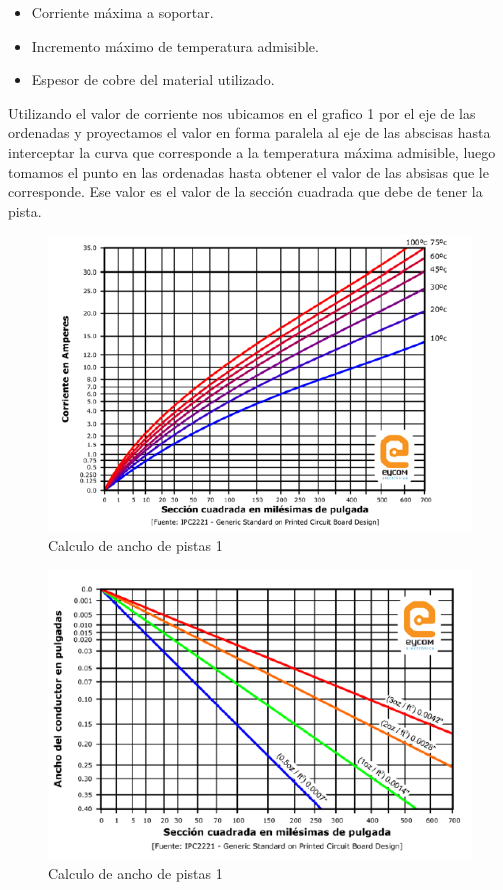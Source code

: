 \begin{itemize} 
\item Corriente máxima a soportar.
\item Incremento máximo de temperatura admisible.
\item Espesor de cobre del material utilizado.
\end{itemize}
Utilizando el valor de corriente nos ubicamos en el grafico 1 por el eje de las ordenadas y proyectamos el valor en forma paralela al eje de las abscisas hasta interceptar la curva que corresponde a la temperatura máxima admisible, luego tomamos el punto en las ordenadas hasta obtener el valor de las absisas que le corresponde. Ese valor es el valor de la sección cuadrada que debe de tener la pista.

\begin{figure}[H]
\centering
\includegraphics[width=12cm]{capitulo2/figs/figura1.png}
\caption{Calculo de ancho de pistas 1}
\end{figure}

\begin{figure}[H]
\centering
\includegraphics[width=12cm]{capitulo2/figs/figura2.png}
\caption{Calculo de ancho de pistas 1}
\end{figure}





